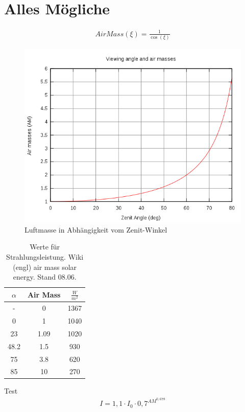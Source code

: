 \documentclass[fontsize=10pt,paper=a4,bibliography=totoc]{scrartcl}
\begin{document}
\section{Alles Mögliche}

\begin{align*}
	AirMass(\xi)=\frac{1}{\cos(\xi)}
\end{align*}

\begin{figure}[htb]
	\centering
	\includegraphics[width=\textwidth]{images/Airmass.png}
	\caption{Luftmasse in Abhängigkeit vom Zenit-Winkel}
	\label{pic:AirMass}
\end{figure}

\begin{table}
\centering
	\caption{Werte für Strahlungsleistung. Wiki (engl) air mass solar energy. Stand 08.06.}
	\label{tab:airmass}
\begin{tabular}{|c|c|c|}
	\hline
	$\alpha$ & Air Mass & $\frac{W}{m^2}$\\
	\hline
	- & 0 & 1367\\
	\hline
	0 & 1 & 1040\\
	\hline
	23 & 1.09 & 1020\\
	\hline
	48.2 & 1.5 & 930\\
	\hline
	75 & 3.8 & 620\\
	\hline
	85 & 10 & 270\\
	\hline
\end{tabular}
\end{table}
Test
\begin{align*}
	I=1,1\cdot I_0 \cdot 0,7^{AM^{0,678}}
	\label{eqn:Intensity}
\end{align*}
\end{document}
